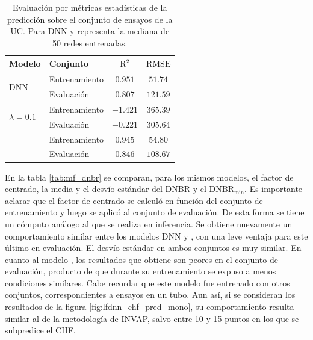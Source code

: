 \begin{table}[h]
	\centering
	\caption{Evaluación por métricas estadísticas de la predicción sobre el conjunto de ensayos de la UC. Para DNN y \mfdnn{} representa la mediana de 50 redes entrenadas.}
	\begin{tabular}{p{2cm} l c c} 
        \toprule
        \textbf{Modelo} & \textbf{Conjunto} & $\bm{\mathrm{R}^2}$ & $\bm{\mathrm{RMSE}}$ \\ \hline
        \multirow{2}{*}{DNN}     
                & Entrenamiento & $0.951$ & $51.74$ \\
                & Evaluación    & $0.807$ & $121.59$ \\
        \multirow{2}{=}{\lfpinn{} $\lambda=0.1$}     
                & Entrenamiento & $-1.421$ & $365.39$ \\
                & Evaluación    & $-0.221$ & $305.64$ \\
        \multirow{2}{*}{\mfdnn{}}     
                & Entrenamiento & $0.945$ & $54.80$ \\
                & Evaluación    & $0.846$ & $108.67$ \\
		\bottomrule
	\end{tabular}
	\label{tab:mf_estadistica}
\end{table}

En la tabla \ref{tab:mf_dnbr} se comparan, para los mismos modelos, el factor de centrado, la media y el desvío estándar del DNBR y el $\mathrm{DNBR}_\mathrm{min}$. Es importante aclarar que el factor de centrado se calculó en función del conjunto de entrenamiento y luego se aplicó al conjunto de evaluación. De esta forma se tiene un cómputo análogo al que se realiza en inferencia. 
Se obtiene nuevamente un comportamiento similar entre los modelos DNN y \mfdnn{}, con una leve ventaja para este último en evaluación. El desvío estándar en ambos conjuntos es muy similar. En cuanto al modelo \lfpinn{}, los resultados que obtiene son peores en el conjunto de evaluación, producto de que durante su entrenamiento se expuso a menos condiciones similares. Cabe recordar que este modelo fue entrenado con otros conjuntos, correspondientes a ensayos en un tubo. Aun así, si se consideran los resultados de la figura \ref{fig:lfdnn_chf_pred_mono}, su comportamiento resulta similar al de la metodología de INVAP, salvo entre 10 y 15 puntos en los que se subpredice el CHF.

